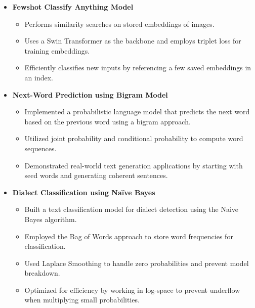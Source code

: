 \documentclass[letterpaper,11pt]{article}
\newcommand{\resitem}[1]{\item #1 \vspace{-2pt}}
\begin{document}
\begin{itemize}
\item[]
	\textbf{Fewshot Classify Anything Model}
	\vspace{-3mm}
	\begin{itemize}
	    \resitem{Performs similarity searches on stored embeddings of images.}
	    \resitem{Uses a Swin Transformer as the backbone and employs triplet loss for training embeddings.}
	    \resitem{Efficiently classifies new inputs by referencing a few saved embeddings in an index.}
	\end{itemize}

\item[]
	\textbf{Next-Word Prediction using Bigram Model}
	\vspace{-3mm}
	\begin{itemize}
	    \resitem{Implemented a probabilistic language model that predicts the next word based on the previous word using a bigram approach.}
	    \resitem{Utilized joint probability and conditional probability to compute word sequences.}
	    \resitem{Demonstrated real-world text generation applications by starting with seed words and generating coherent sentences.}
	\end{itemize}

\item[]
	\textbf{Dialect Classification using Naïve Bayes}
	\vspace{-3mm}
	\begin{itemize}
	    \resitem{Built a text classification model for dialect detection using the Naive Bayes algorithm.}
	    \resitem{Employed the Bag of Words approach to store word frequencies for classification.}
	    \resitem{Used Laplace Smoothing to handle zero probabilities and prevent model breakdown.}
	    \resitem{Optimized for efficiency by working in log-space to prevent underflow when multiplying small probabilities.}
	\end{itemize}

\end{itemize}
\end{document}
